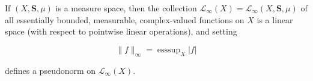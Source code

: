 If $(X, \mathbf{S}, \mu)$ is a measure space, then the collection $\mathcal{L}_\infty(X) = \mathcal{L}_\infty(X, \mathbf{S}, \mu)$ of all essentially bounded, measurable, complex-valued functions on $X$ is a linear space (with respect to pointwise linear operations), and setting

$$\| f \|_\infty = \operatorname{ess sup}_X |f|$$

defines a pseudonorm on $\mathcal{L}_\infty(X)$.

